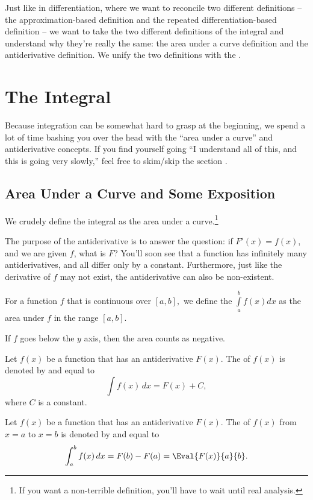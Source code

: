\documentclass[blue,onecol]{shooting}
\begin{document}
Just like in differentiation, where we want to reconcile two different definitions -- the approximation-based definition and the repeated differentiation-based definition -- we want to take the two different definitions of the integral and understand why they're really the same: the area under a curve definition and the antiderivative definition. We unify the two definitions with the .

\section{The Integral}

Because integration can be somewhat hard to grasp at the beginning, we spend a lot of time bashing you over the head with the ``area under a curve'' and antiderivative concepts. If you find yourself going ``I understand all of this, and this is going very slowly,'' feel free to skim/skip the section .

\subsection{Area Under a Curve and Some Exposition}

We crudely define the integral as the area under a curve.\footnote{If you want a non-terrible definition, you'll have to wait until real analysis.}

The purpose of the antiderivative is to answer the question: if $F'(x)=f(x)$, and we are given $f$, what is $F$? You'll soon see that a function has infinitely many antiderivatives, and all differ only by a constant. Furthermore, just like the derivative of $f$ may not exist, the antiderivative can also be non-existent.

\begin{defi}[Integral]
For a function $f$ that is continuous over $[a,b],$ we define the  $\int\limits_{a}^{b}f(x)dx$ as the area under $f$ in the range $[a,b].$

If $f$ goes below the $y$ axis, then the area counts as negative.
\end{defi}

\begin{defi}
Let $f(x)$ be a function that has an antiderivative $F(x)$. The  of $f(x)$ is denoted by and equal to
$$\int f(x)\,dx = F(x)+C,$$
where $C$ is a constant.
\end{defi}
\begin{defi}
Let $f(x)$ be a function that has an antiderivative $F(x)$. The  of $f(x)$ from $x=a$ to $x=b$ is denoted by and equal to
$$\int_a^b f(x)\, dx=F(b)-F(a)=\Eval{F(x)}{a}{b}.$$
\end{defi}
\end{document}
